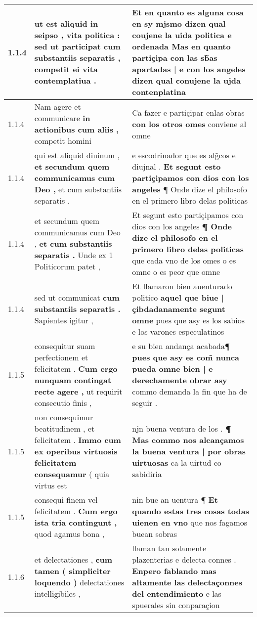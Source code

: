 \begin{tabular}{|p{1cm}|p{6.5cm}|p{6.5cm}|}
1.1.4 & ut est aliquid in seipso , vita politica : \textbf{ sed ut participat cum substantiis separatis , } competit ei vita contemplatiua . & Et en quanto es alguna cosa en sy mjsmo dizen qual coujene la uida politica e ordenada \textbf{ Mas en quanto partiçipa con las sb̃as apartadas | e con los angeles } dizen qual conujene la ujda contenplatina \\\hline
1.1.4 & Nam agere et communicare \textbf{ in actionibus cum aliis , } competit homini & Ca fazer e partiçipar enlas obras \textbf{ con los otros omes } conviene al omne \\\hline
1.1.4 & qui est aliquid diuinum , \textbf{ et secundum quem communicamus cum Deo , } et cum substantiis separatis . & e escodrinador que es alg̃cos e diujnal . \textbf{ Et segunt esto partiçipamos con dios con los angeles } ¶ Onde dize el philosofo en el primero libro delas politicas \\\hline
1.1.4 & et secundum quem communicamus cum Deo , \textbf{ et cum substantiis separatis . } Unde ex 1 Politicorum patet , & Et segunt esto partiçipamos con dios con los angeles \textbf{ ¶ Onde dize el philosofo en el primero libro delas politicas } que cada vno de los omes o es omne o es peor que omne \\\hline
1.1.4 & sed ut communicat \textbf{ cum substantiis separatis . } Sapientes igitur , & Et llamaron bien auenturado politico \textbf{ aquel que biue | çibdadanamente segunt omne } pues que asy es los sabios e los varones especulatinos \\\hline
1.1.5 & consequitur suam perfectionem et felicitatem . \textbf{ Cum ergo nunquam contingat recte agere , } ut requirit consecutio finis , & e su bien andança acabada¶ \textbf{ pues que asy es com̃ nunca pueda omne bien | e derechamente obrar asy } commo demanda la fin que ha de seguir . \\\hline
1.1.5 & non consequimur beatitudinem , et felicitatem . \textbf{ Immo cum ex operibus virtuosis felicitatem consequamur } ( quia virtus est & njn buena ventura de los . \textbf{ ¶ Mas commo nos alcançamos la buena ventura | por obras uirtuosas } ca la uirtud co sabidiria \\\hline
1.1.5 & consequi finem vel felicitatem . \textbf{ Cum ergo ista tria contingunt , } quod agamus bona , & nin bue an uentura ¶ \textbf{ Et quando estas tres cosas todas uienen en vno } que nos fagamos buean sobras \\\hline
1.1.6 & et delectationes , \textbf{ cum tamen ( simpliciter loquendo ) } delectationes intelligibiles , & llaman tan solamente plazenterias e delecta connes . \textbf{ Enpero fablando mas altamente las delectaçonnes del entendimiento } e las spuerales sin conparaçion \\\hline

\end{tabular}
